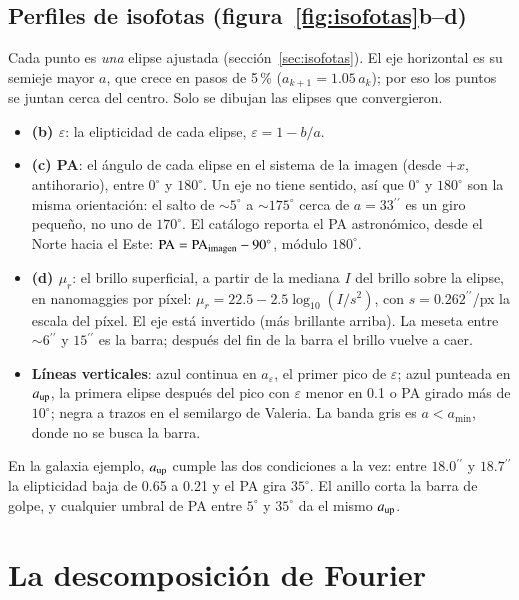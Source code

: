 \documentclass[11pt,a4paper]{article}
\newcommand{\as}{\ensuremath{^{\prime\prime}}}
\newcommand{\aeps}{a_\varepsilon}
\begin{document}
\subsection{Perfiles de isofotas (figura~\ref{fig:isofotas}b--d)}

Cada punto es \emph{una} elipse ajustada (sección~\ref{sec:isofotas}). El eje horizontal es su semieje mayor
$a$, que crece en pasos de 5\,\% ($a_{k+1} = 1.05\,a_k$); por eso los puntos se juntan cerca del centro. Solo se
dibujan las elipses que convergieron.
\begin{itemize}
\item \textbf{(b) $\varepsilon$}: la elipticidad de cada elipse, $\varepsilon = 1 - b/a$.
\item \textbf{(c) PA}: el ángulo de cada elipse en el sistema de la imagen (desde $+x$, antihorario), entre
$0^\circ$ y $180^\circ$. Un eje no tiene sentido, así que $0^\circ$ y $180^\circ$ son la misma orientación: el
salto de $\sim 5^\circ$ a $\sim 175^\circ$ cerca de $a = 33\as$ es un giro pequeño, no uno de $170^\circ$. El
catálogo reporta el PA astronómico, desde el Norte hacia el Este: $\mathrm{PA} = \mathrm{PA}_{\rm imagen} -
90^\circ$, módulo $180^\circ$.
\item \textbf{(d) $\mu_r$}: el brillo superficial, a partir de la mediana $I$ del brillo sobre la elipse, en
nanomaggies por píxel: $\mu_r = 22.5 - 2.5\log_{10}(I/s^2)$, con $s = 0.262\as$/px la escala del píxel. El eje
está invertido (más brillante arriba). La meseta entre $\sim 6\as$ y $15\as$ es la barra; después del fin de
la barra el brillo vuelve a caer.
\item \textbf{Líneas verticales}: azul continua en $\aeps$, el primer pico de $\varepsilon$; azul punteada en
$a_{\rm up}$, la primera elipse después del pico con $\varepsilon$ menor en 0.1 o PA girado más de $10^\circ$;
negra a trazos en el semilargo de Valeria. La banda gris es $a < a_{\min}$, donde no se busca la barra.
\end{itemize}
En la galaxia ejemplo, $a_{\rm up}$ cumple las dos condiciones a la vez: entre $18.0\as$ y $18.7\as$ la
elipticidad baja de 0.65 a 0.21 y el PA gira $35^\circ$. El anillo corta la barra de golpe, y cualquier umbral de
PA entre $5^\circ$ y $35^\circ$ da el mismo $a_{\rm up}$.


\section{La descomposición de Fourier}\label{sec:fourier}
\end{document}
